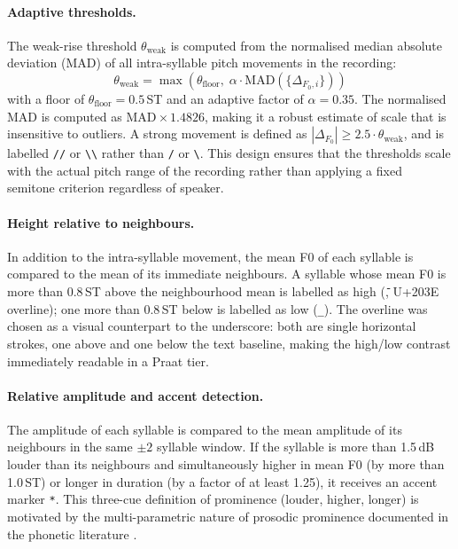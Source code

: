 \paragraph{Adaptive thresholds.}
The weak-rise threshold $\theta_{\mathrm{weak}}$ is computed from the normalised median absolute deviation (MAD) of all intra-syllable pitch movements in the recording:
\begin{equation}
  \theta_{\mathrm{weak}} = \max\!\left(\theta_{\mathrm{floor}},\;
    \alpha \cdot \mathrm{MAD}(\{\Delta_{F_0,i}\})\right)
\end{equation}
with a floor of $\theta_{\mathrm{floor}} = 0.5$\,ST and an adaptive factor of
$\alpha = 0.35$. The normalised MAD is computed as $\text{MAD} \times 1.4826$, making it a robust estimate of scale that is insensitive to outliers. A strong movement is defined as
$|\Delta_{F_0}| \geq 2.5 \cdot \theta_{\mathrm{weak}}$, and is labelled
\texttt{//} or \texttt{\textbackslash\textbackslash} rather than \texttt{/} or
\texttt{\textbackslash}. This design ensures that the thresholds scale with the
actual pitch range of the recording rather than applying a fixed semitone
criterion regardless of speaker.

\paragraph{Height relative to neighbours.}
In addition to the intra-syllable movement, the mean F0 of each syllable is
compared to the mean of its immediate neighbours. A syllable whose mean F0 is
more than 0.8\,ST above the neighbourhood mean is labelled as high
(\texttt{{\={}}}, U+203E overline); one more than 0.8\,ST below is labelled as
low (\texttt{\_}). The overline was chosen as a visual counterpart to the
underscore: both are single horizontal strokes, one above and one below the
text baseline, making the high/low contrast immediately readable in a Praat tier.

\paragraph{Relative amplitude and accent detection.}
The amplitude of each syllable is compared to the mean amplitude of its
neighbours in the same $\pm 2$ syllable window. If the syllable is more than
1.5\,dB louder than its neighbours and simultaneously higher in mean F0 (by more
than 1.0\,ST) or longer in duration (by a factor of at least 1.25), it receives
an accent marker \texttt{*}. This three-cue definition of prominence (louder,
higher, longer) is motivated by the multi-parametric nature of prosodic
prominence documented in the phonetic literature \cite{ladd2008intonational}.


